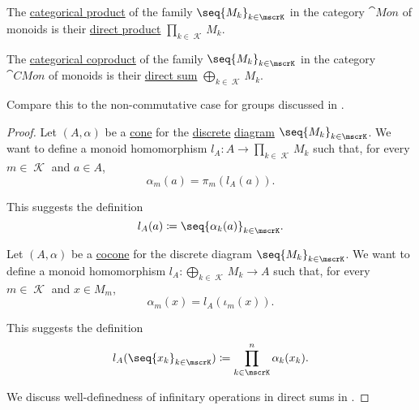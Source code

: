 \begin{proposition}\label{thm:monoid_categorical_limits}
  \hfill
  \begin{thmenum}
     The \hyperref[def:discrete_category_limits]{categorical product} of the family \( \seq{ M_k }_{k \in \mscrK} \) in the category \hyperref[def:monoid/category]{\( \cat{Mon} \)} of monoids is their \hyperref[def:monoid_direct_product]{direct product} \( \prod_{k \in \mscrK} M_k \).

     The \hyperref[def:discrete_category_limits]{categorical coproduct} of the family \( \seq{ M_k }_{k \in \mscrK} \) in the category \hyperref[def:monoid/category]{\( \cat{CMon} \)} of  monoids is their \hyperref[def:monoid_direct_product]{direct sum} \( \bigoplus_{k \in \mscrK} M_k \).

    Compare this to the non-commutative case for groups discussed in .
  \end{thmenum}
\end{proposition}
\begin{proof}
   Let \( (A, \alpha) \) be a \hyperref[def:category_of_cones/cone]{cone} for the \hyperref[def:discrete_category]{discrete} \hyperref[def:categorical_diagram]{diagram} \( \seq{ M_k }_{k \in \mscrK} \). We want to define a monoid homomorphism \( l_A: A \to \prod_{k \in \mscrK} M_k \) such that, for every \( m \in \mscrK \) and \( a \in A \),
  \begin{equation*}
    \alpha_m(a) = \pi_m(l_A(a)).
  \end{equation*}

  This suggests the definition
  \begin{equation*}
    l_A(a) \coloneqq \seq{ \alpha_k(a) }_{k \in \mscrK}.
  \end{equation*}

    Let \( (A, \alpha) \) be a \hyperref[def:category_of_cones/cocone]{cocone} for the discrete diagram \( \seq{ M_k }_{k \in \mscrK} \). We want to define a monoid homomorphism \( l_A: \bigoplus_{k \in \mscrK} M_k \to A \) such that, for every \( m \in \mscrK \) and \( x \in M_m \),
  \begin{equation*}
    \alpha_m(x) = l_A(\iota_m(x)).
  \end{equation*}

  This suggests the definition
  \begin{equation*}
    l_A(\seq{ x_k }_{k \in \mscrK}) \coloneqq \prod_{k \in \mscrK}^n \alpha_k(x_k).
  \end{equation*}

  We discuss well-definedness of infinitary operations in direct sums in .
\end{proof}
